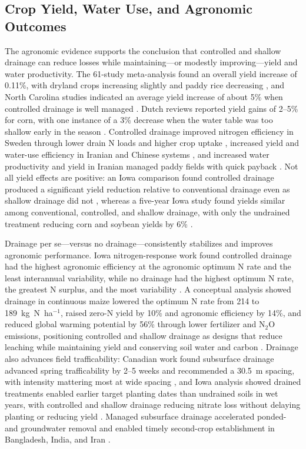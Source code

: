 \subsection{Crop Yield, Water Use, and Agronomic Outcomes}

The agronomic evidence supports the conclusion that controlled and shallow
drainage can reduce losses while maintaining---or modestly improving---yield and
water productivity. The 61-study meta-analysis found an overall yield increase of
0.11\%, with dryland crops increasing slightly and paddy rice decreasing
\parencite{Wang2020c}, and North Carolina studies indicated an average yield
increase of about 5\% when controlled drainage is well managed
\parencite{Strock2011}. Dutch reviews reported yield gains of 2--5\% for corn,
with one instance of a 3\% decrease when the water table was too shallow early
in the season \parencite{deWit2022}. Controlled drainage improved nitrogen
efficiency in Sweden through lower drain N loads and higher crop uptake
\parencite{Wesström2007}, increased yield and water-use efficiency in Iranian
and Chinese systems \parencite{Jouni2018,Dou2021,Dou2023}, and increased water
productivity and yield in Iranian managed paddy fields with quick payback
\parencite{DarziNaftchali2018b}. Not all yield effects are positive: an Iowa
comparison found controlled drainage produced a significant yield reduction
relative to conventional drainage even as shallow drainage did not
\parencite{Helmers2012}, whereas a five-year Iowa study found yields similar
among conventional, controlled, and shallow drainage, with only the undrained
treatment reducing corn and soybean yields by 6\% \parencite{Schott2017}.

Drainage per se---versus no drainage---consistently stabilizes and improves
agronomic performance. Iowa nitrogen-response work found controlled drainage had
the highest agronomic efficiency at the agronomic optimum N rate and the least
interannual variability, while no drainage had the highest optimum N rate, the
greatest N surplus, and the most variability \parencite{Maas2022}. A conceptual
analysis showed drainage in continuous maize lowered the optimum N rate from 214
to 189~kg~N~ha$^{-1}$, raised zero-N yield by 10\% and agronomic efficiency by
14\%, and reduced global warming potential by 56\% through lower fertilizer and
N$_2$O emissions, positioning controlled and shallow drainage as designs that
reduce leaching while maintaining yield and conserving soil water and carbon
\parencite{Castellano2019}. Drainage also advances field trafficability: Canadian
work found subsurface drainage advanced spring trafficability by 2--5 weeks and
recommended a 30.5~m spacing, with intensity mattering most at wide spacing
\parencite{PAUL1983}, and Iowa analysis showed drained treatments enabled earlier
target planting dates than undrained soils in wet years, with controlled and
shallow drainage reducing nitrate loss without delaying planting or reducing
yield \parencite{Schott2017b}. Managed subsurface drainage accelerated ponded-
and groundwater removal and enabled timely second-crop establishment in
Bangladesh, India, and Iran \parencite{Okwany2016,Prathapar2018,Rahimi2024}.

